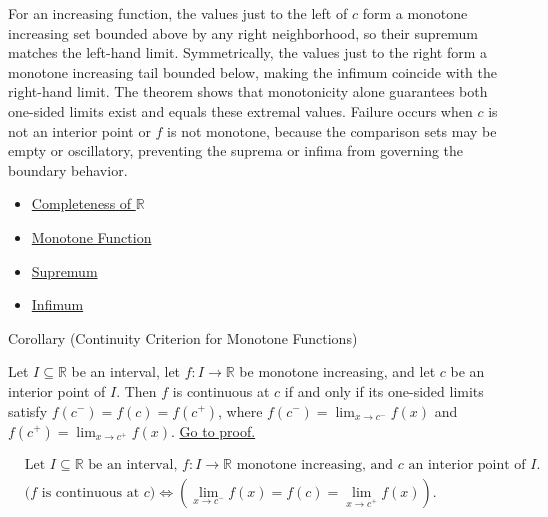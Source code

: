 \begin{remark*}[Interpretation]
For an increasing function, the values just to the left of $c$ form a monotone increasing set bounded above by any right neighborhood, so their supremum matches the left-hand limit. Symmetrically, the values just to the right form a monotone increasing tail bounded below, making the infimum coincide with the right-hand limit. The theorem shows that monotonicity alone guarantees both one-sided limits exist and equals these extremal values. Failure occurs when $c$ is not an interior point or $f$ is not monotone, because the comparison sets may be empty or oscillatory, preventing the suprema or infima from governing the boundary behavior.
\end{remark*}

\begin{dependencies}
\begin{itemize}
  \item \hyperref[ax:completeness-of-reals]{Completeness of $\mathbb{R}$}
  \item \hyperref[def:function-monotone]{Monotone Function}
  \item \hyperref[def:supremum]{Supremum}
  \item \hyperref[def:infimum]{Infimum}
\end{itemize}
\end{dependencies}
\begin{corollarybox}{Corollary (Continuity Criterion for Monotone Functions)}
\begin{corollary}
\label{cor:monotone-continuity-criterion}
Let $I \subseteq \mathbb{R}$ be an interval, let $f:I \to \mathbb{R}$ be monotone increasing, and let $c$ be an interior point of $I$. Then $f$ is continuous at $c$ if and only if its one-sided limits satisfy $f(c^-)=f(c)=f(c^+)$, where $f(c^-)=\lim_{x\to c^-} f(x)$ and $f(c^+)=\lim_{x\to c^+} f(x)$.
\hyperref[prf:monotone-continuity-criterion]{Go to proof.}
\end{corollary}
\end{corollarybox}

\begin{remark*}
\[
\begin{aligned}
&\text{Let } I \subseteq \mathbb{R} \text{ be an interval, } f:I\to\mathbb{R} \text{ monotone increasing, and } c \text{ an interior point of } I.\\
&\bigl(f \text{ is continuous at } c\bigr)
\Longleftrightarrow
\left(\lim_{x\to c^-} f(x) = f(c) = \lim_{x\to c^+} f(x)\right).
\end{aligned}
\]
\end{remark*}

